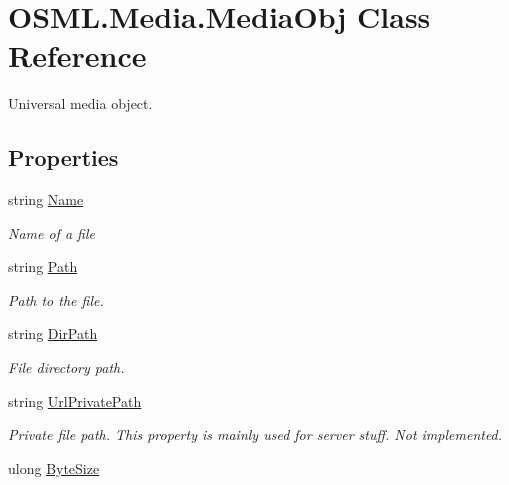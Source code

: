 \hypertarget{classOSML_1_1Media_1_1MediaObj}{}\section{O\+S\+M\+L.\+Media.\+Media\+Obj Class Reference}
\label{classOSML_1_1Media_1_1MediaObj}


Universal media object.  


\subsection*{Properties}
\begin{DoxyCompactItemize}
\item 
string \mbox{\hyperlink{classOSML_1_1Media_1_1MediaObj_ad30994fb767d57387d453c210794fd03}{Name}}
\begin{DoxyCompactList}\small\item\em Name of a file \end{DoxyCompactList}\item 
string \mbox{\hyperlink{classOSML_1_1Media_1_1MediaObj_a7bf2f35db79a8833e2f1bb657edc70f3}{Path}}
\begin{DoxyCompactList}\small\item\em Path to the file. \end{DoxyCompactList}\item 
string \mbox{\hyperlink{classOSML_1_1Media_1_1MediaObj_ace30e6735e6acde3d064304395087474}{Dir\+Path}}
\begin{DoxyCompactList}\small\item\em File directory path. \end{DoxyCompactList}\item 
string \mbox{\hyperlink{classOSML_1_1Media_1_1MediaObj_a8ecc20f36044949ce3fde1af609e55f9}{Url\+Private\+Path}}
\begin{DoxyCompactList}\small\item\em Private file path. This property is mainly used for server stuff. Not implemented. \end{DoxyCompactList}\item 
ulong \mbox{\hyperlink{classOSML_1_1Media_1_1MediaObj_a4751d437d47b5634ab48868e56ffa89a}{Byte\+Size}}

\end{DoxyCompactItemize}
